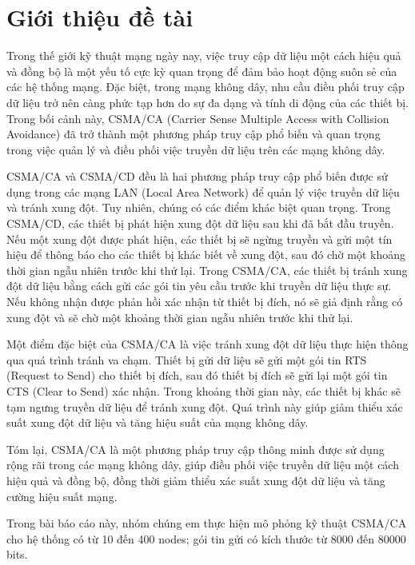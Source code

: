 %
\chapter{Giới thiệu đề tài}
Trong thế giới kỹ thuật mạng ngày nay, việc truy cập dữ liệu một cách hiệu quả và đồng bộ là một yếu tố cực kỳ 
quan trọng để đảm bảo hoạt động suôn sẻ của các hệ thống mạng. Đặc biệt, trong mạng không dây, nhu cầu điều phối 
truy cập dữ liệu trở nên càng phức tạp hơn do sự đa dạng và tính di động của các thiết bị. Trong bối cảnh này, CSMA/CA 
(Carrier Sense Multiple Access with Collision Avoidance) đã trở thành một phương pháp truy cập phổ biến và quan trọng 
trong việc quản lý và điều phối việc truyền dữ liệu trên các mạng không dây.

CSMA/CA và CSMA/CD đều là hai phương pháp truy cập phổ biến được sử dụng trong các mạng LAN (Local Area Network) để quản 
lý việc truyền dữ liệu và tránh xung đột. Tuy nhiên, chúng có các điểm khác biệt quan trọng. Trong CSMA/CD, các thiết bị 
phát hiện xung đột dữ liệu sau khi đã bắt đầu truyền. Nếu một xung đột được phát hiện, các thiết bị sẽ ngừng truyền và gửi 
một tín hiệu để thông báo cho các thiết bị khác biết về xung đột, sau đó chờ một khoảng thời gian ngẫu nhiên trước khi thử lại.
Trong CSMA/CA, các thiết bị tránh xung đột dữ liệu bằng cách gửi các gói tin yêu cầu trước khi truyền dữ liệu thực sự. Nếu không 
nhận được phản hồi xác nhận từ thiết bị đích, nó sẽ giả định rằng có xung đột và sẽ chờ một khoảng thời gian ngẫu nhiên trước khi thử lại.

Một điểm đặc biệt của CSMA/CA là việc tránh xung đột dữ liệu thực hiện thông qua quá trình tránh va chạm. Thiết bị gửi dữ liệu sẽ 
gửi một gói tin RTS (Request to Send) cho thiết bị đích, sau đó thiết bị đích sẽ gửi lại một gói tin CTS (Clear to Send) xác nhận. 
Trong khoảng thời gian này, các thiết bị khác sẽ tạm ngưng truyền dữ liệu để tránh xung đột. Quá trình này giúp giảm thiểu xác suất 
xung đột dữ liệu và tăng hiệu suất của mạng không dây.

Tóm lại, CSMA/CA là một phương pháp truy cập thông minh được sử dụng rộng rãi trong các mạng không dây, giúp điều phối việc truyền dữ 
liệu một cách hiệu quả và đồng bộ, đồng thời giảm thiểu xác suất xung đột dữ liệu và tăng cường hiệu suất mạng.

Trong bài báo cáo này, nhóm chúng em thực hiện mô phỏng kỹ thuật CSMA/CA cho hệ thống có từ 10 đến 400 nodes; gói tin gửi có kích thước từ 8000
đến 80000 bits.